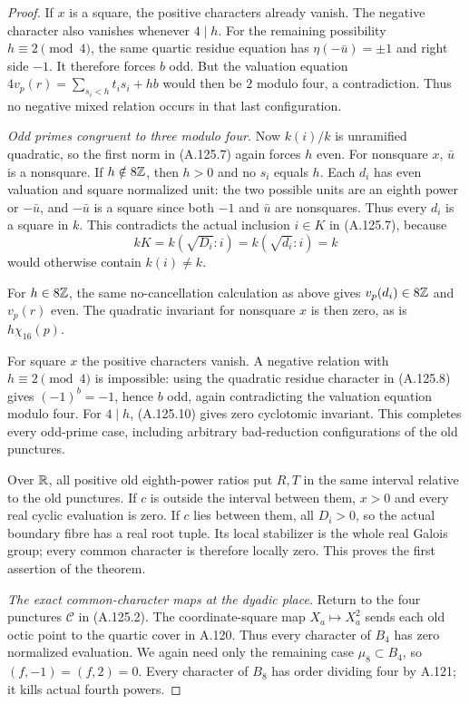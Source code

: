 \begin{proof}
If $x$ is a square, the positive characters already
vanish.  The negative character also vanishes whenever
$4\mid h$.
For the remaining possibility $h\equiv2\pmod4$, the
same quartic residue equation has
$\eta(-\bar u)=\pm1$ and right side $-1$.
It therefore forces $b$ odd.
But the valuation equation
$4v_p(r)=\sum_{s_i<h}t_is_i+hb$ would then be $2$
modulo four, a contradiction.
Thus no negative mixed relation occurs in that last
configuration.

\emph{Odd primes congruent to three modulo four.}
Now $k(i)/k$ is unramified quadratic, so the first
norm in (A.125.7) again forces $h$ even.
For nonsquare $x$, $\bar u$ is a nonsquare.
If $h\notin8\mathbb Z$, then $h>0$ and no $s_i$ equals $h$.
Each $d_i$ has even valuation and square normalized
unit: the two possible units are an eighth power or
$-\bar u$, and $-\bar u$ is a square since both
$-1$ and $\bar u$ are nonsquares.
Thus every $d_i$ is a square in $k$.
This contradicts the actual inclusion $i\in K$ in
(A.125.7), because
\[
 kK=k(\sqrt{D_i}:i)=k(\sqrt{d_i}:i)=k
\tag{A.125.13}
\]
would otherwise contain $k(i)\ne k$.

For $h\in8\mathbb Z$, the same no-cancellation calculation
as above gives $v_p(d_i)\in8\mathbb Z$ and $v_p(r)$ even.
The quadratic invariant for nonsquare $x$ is then
zero, as is $h\chi_{16}(p)$.

For square $x$ the positive characters vanish.
A negative relation with $h\equiv2\pmod4$ is
impossible: using the quadratic residue character
in (A.125.8) gives $(-1)^b=-1$, hence $b$ odd,
again contradicting the valuation equation modulo
four.
For $4\mid h$, (A.125.10) gives zero cyclotomic
invariant.  This completes every odd-prime case,
including arbitrary bad-reduction configurations
of the old punctures.

Over $\mathbb R$, all positive old eighth-power ratios put
$R,T$ in the same interval relative to the old
punctures.
If $c$ is outside the interval between them, $x>0$
and every real cyclic evaluation is zero.
If $c$ lies between them, all $D_i>0$, so the actual
boundary fibre has a real root tuple.
Its local stabilizer is the whole real Galois group;
every common character is therefore locally zero.
This proves the first assertion of the theorem.

\emph{The exact common-character maps at the dyadic place.}
Return to the four punctures $\mathcal C$ in (A.125.2).
The coordinate-square map $X_a\mapsto X_a^2$ sends
each old octic point to the quartic cover in A.120.
Thus every character of $B_4$ has zero normalized
evaluation.
We again need only the remaining case
$\mu_8\subset B_4$, so $(f,-1)=(f,2)=0$.
Every character of $B_8$ has order dividing four by
A.121; it kills actual fourth powers.


\end{proof}
